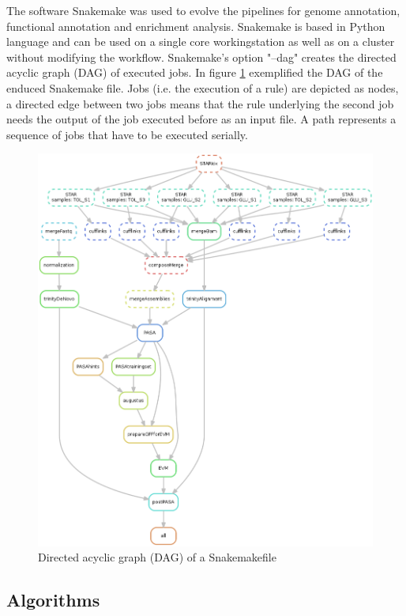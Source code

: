 \documentclass[12pt, a4paper]{report}
\begin{document}
The software Snakemake was used to evolve the pipelines for genome annotation, functional annotation and enrichment analysis. Snakemake is based in Python language and can be used on a single core workingstation as well as on a cluster without modifying the workflow. 
Snakemake's option "--dag" creates the directed acyclic graph (DAG) of executed jobs. \cite{Koster2012}  
\newline
In figure \ref{fig:DAG} exemplified the DAG of the enduced Snakemake file. Jobs (i.e. the execution of a rule) are depicted as nodes, a directed edge between two jobs means that the rule underlying the second job needs the output of the job executed before as an input file. A path represents a sequence of jobs that have to be executed serially.
\begin{figure}[H]
	\centering	
	\includegraphics[width=400pt]{pics/DAG.png}
	\caption[Directed acyclic graph (DAG)]
	{Directed acyclic graph (DAG) of a Snakemakefile}
	\label{fig:DAG}
\end{figure}

\newpage
\subsection{Algorithms}
\end{document}
